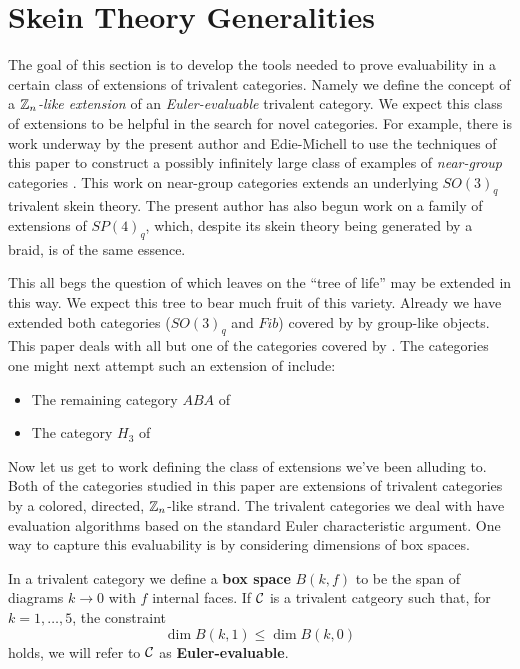 \section{Skein Theory Generalities}\label{sec:skein}

The goal of this section is to develop the tools needed to prove evaluability in a certain class of extensions of trivalent categories.
Namely we define the concept of a {\it $\mathbb{Z}_n$-like extension} of an {\it Euler-evaluable} trivalent category.
We expect this class of extensions to be helpful in the search for novel categories.
For example, there is work underway by the present author and Edie-Michell to use the techniques of this paper to 
construct a possibly infinitely large class of examples of {\it near-group} categories \cite{gannon_near-groups}.
This work on near-group categories \cite{cain_me_near_groups} extends an underlying $SO(3)_q$ trivalent skein theory.
The present author has also begun work \cite{me_sp4} on a family of extensions of $SP(4)_q$, which, despite its skein theory being
generated by a braid, is of the same essence. 


This all begs the question of which leaves on the ``tree of life'' \cite{tricats} may be extended in this way.
We expect this tree to bear much fruit of this variety.
Already we have extended both categories ($SO(3)_q$ and $Fib$) covered by \cite[Theorem A]{tricats} by group-like objects.
This paper deals with all but one of the categories covered by \cite[Theorem B]{tricats}.
The categories one might next attempt such an extension of include:
\begin{itemize}
    \item The remaining category $ABA$ of \cite[Theorem B]{tricats}
    \item The category $H_3$ of \cite[Theorem C]{tricats}
\end{itemize}

Now let us get to work defining the class of extensions we've been alluding to.
Both of the categories studied in this paper are extensions of trivalent categories by a colored, directed, $\mathbb{Z}_n$-like strand. 
The trivalent categories we deal with have evaluation algorithms based on the standard Euler characteristic argument.
One way to capture this evaluability is by considering dimensions of box spaces.
\begin{definition}
    In a trivalent category we define a {\bf box space} $B(k,f)$ to be the span of diagrams $k\to0$ with $f$ internal faces.
    If $\mathcal{C}$ is a trivalent catgeory such that, for $k=1,\dots,5$, the constraint
    \[
    \dim B(k,1) \leq \dim B(k,0)
    \]
    holds, we will refer to $\mathcal{C}$ as {\bf Euler-evaluable}.
\end{definition}

